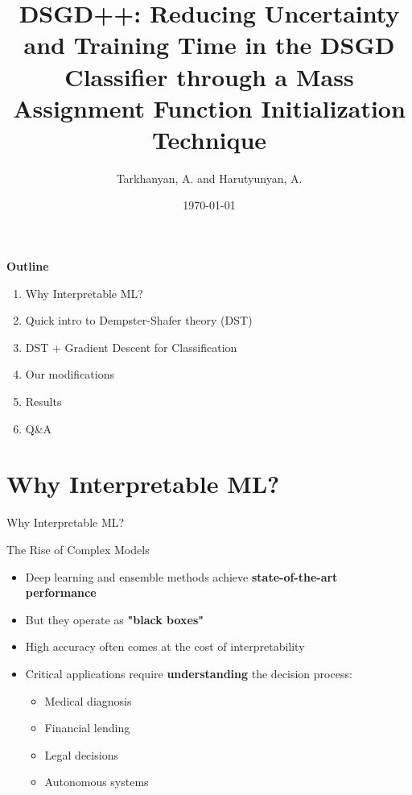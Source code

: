\documentclass[aspectratio=169]{beamer}
\title{DSGD++: Reducing Uncertainty and Training Time in the DSGD Classifier through a Mass Assignment Function Initialization Technique}
\author{Tarkhanyan, A. and Harutyunyan, A.}
\date{\today}
\begin{document}
\begin{frame}
  \titlepage
\end{frame}

\begin{frame}
    \textbf{Outline}
    \begin{enumerate}
        \item Why Interpretable ML?
        \item Quick intro to Dempster-Shafer theory (DST)
        \item DST + Gradient Descent for Classification
        \item Our modifications
        \item Results
        \item Q\&A
    \end{enumerate}
\end{frame}


\section{Why Interpretable ML?}

\begin{frame}
    \begin{center}
        \Huge Why Interpretable ML?
    \end{center}
\end{frame}

\begin{frame}{The Rise of Complex Models}
    \begin{itemize}
        \item Deep learning and ensemble methods achieve \textbf{state-of-the-art performance}
        \item But they operate as \textbf{"black boxes"}
        \item High accuracy often comes at the cost of interpretability
        \item Critical applications require \textbf{understanding} the decision process:
        \begin{itemize}
            \item Medical diagnosis
            \item Financial lending
            \item Legal decisions
            \item Autonomous systems
        \end{itemize}
    \end{itemize}
\end{frame}
\end{document}
